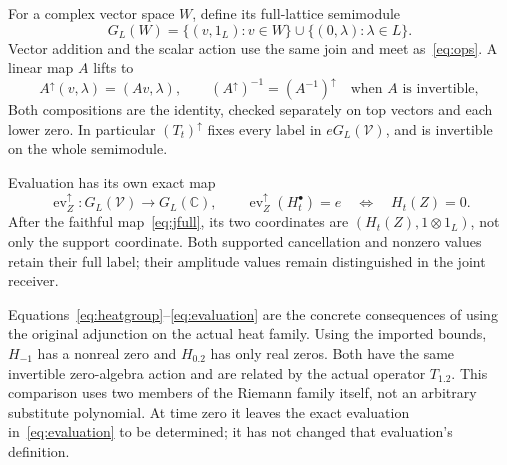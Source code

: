 \documentclass[11pt,a4paper]{article}
\theoremstyle{definition}\newtheorem{definition}[theorem]{Definition}\newtheorem{remark}[theorem]{Remark}
\newcommand{\C}{\mathbb C}\newcommand{\R}{\mathbb R}\newcommand{\Z}{\mathbb Z}\newcommand{\B}{\mathbb B}
\begin{document}
For a complex vector space $W$, define its full-lattice semimodule
\[
 G_L(W)=\{(v,1_L):v\in W\}\cup\{(0,\lambda):\lambda\in L\}.
\]
Vector addition and the scalar action use the same join and meet as~\eqref{eq:ops}. A linear map $A$ lifts to
\begin{equation}
 A^\uparrow(v,\lambda)=(Av,\lambda),\qquad
 (A^\uparrow)^{-1}=(A^{-1})^\uparrow\quad\text{when $A$ is invertible},
                                                        \label{eq:lift}
\end{equation}
Both compositions are the identity, checked separately on top vectors and each lower zero. In particular $(T_t)^\uparrow$ fixes every label in $eG_L(\mathcal V)$, and is invertible on the whole semimodule.

Evaluation has its own exact map
\begin{equation}
 \operatorname{ev}_Z^\uparrow:G_L(\mathcal V)\to G_L(\C),\qquad
 \operatorname{ev}_Z^\uparrow(H_t^\bullet)=e
 \quad\Longleftrightarrow\quad H_t(Z)=0.                 \label{eq:evaluation}
\end{equation}
After the faithful map~\eqref{eq:jfull}, its two coordinates are $(H_t(Z),1\otimes1_L)$, not only the support coordinate. Both supported cancellation and nonzero values retain their full label; their amplitude values remain distinguished in the joint receiver.

Equations~\eqref{eq:heatgroup}--\eqref{eq:evaluation} are the concrete consequences of using the original adjunction on the actual heat family. Using the imported bounds, $H_{-1}$ has a nonreal zero and $H_{0.2}$ has only real zeros. Both have the same invertible zero-algebra action and are related by the actual operator $T_{1.2}$. This comparison uses two members of the Riemann family itself, not an arbitrary substitute polynomial. At time zero it leaves the exact evaluation in~\eqref{eq:evaluation} to be determined; it has not changed that evaluation's definition.
\end{document}
